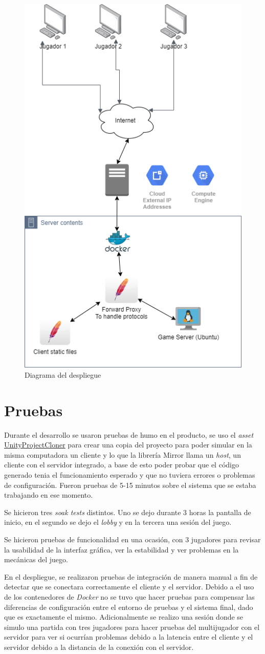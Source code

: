 \begin{figure}[h]
    \centering
    \includegraphics[width=0.5\linewidth]{images/diagrama_deployment.png}
    \caption{Diagrama del despliegue}
    \label{fig:diagrama_despliege}
\end{figure}

\section{Pruebas}
Durante el desarrollo se usaron pruebas de humo en el producto, se uso el \textit{asset} \href{https://github.com/hwaet/UnityProjectCloner}{UnityProjectCloner} para crear una copia del proyecto para poder simular en la misma computadora un cliente y lo que la librería Mirror llama un \textit{host}, un cliente con el servidor integrado, a base de esto poder probar que el código generado tenia el funcionamiento esperado y que no tuviera errores o problemas de configuración. Fueron pruebas de 5-15 minutos sobre el sistema que se estaba trabajando en ese momento.

Se hicieron tres \textit{soak tests} distintos. Uno se dejo durante 3 horas la pantalla de inicio, en el segundo se dejo el \textit{lobby} y en la tercera una sesión del juego.

Se hicieron pruebas de funcionalidad en una ocasión, con 3 jugadores para revisar la usabilidad de la interfaz gráfica, ver la estabilidad y ver problemas en la mecánicas del juego.

En el despliegue, se realizaron pruebas de integración de manera manual a fin de detectar que se conectara correctamente el cliente y el servidor. Debido a el uso de los contenedores de \textit{Docker} no se tuvo que hacer pruebas para compensar las diferencias de configuración entre el entorno de pruebas y el sistema final, dado que es exactamente el mismo. Adicionalmente se realizo una sesión donde se simulo una partida con tres jugadores para hacer pruebas del multijugador con el servidor para ver si ocurrían problemas debido a la latencia entre el cliente y el servidor debido a la distancia de la conexión con el servidor.